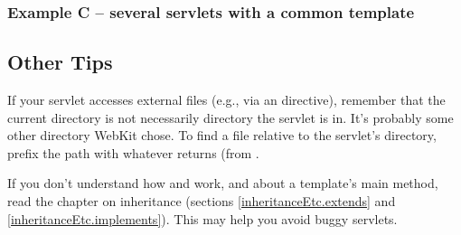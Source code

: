 \subsubsection*{Example C -- several servlets with a common template}




\subsection{Other Tips}
\label{webware.otherTips}

If your servlet accesses external files (e.g., via an 
directive), remember that the current directory is not necessarily directory
the servlet is in.  It's probably some other directory WebKit chose.  To find a
file relative to the servlet's directory, prefix the path with whatever
 returns (from .

If you don't understand how  and  work, and
about a template's main method, read the chapter on inheritance (sections
\ref{inheritanceEtc.extends} and \ref{inheritanceEtc.implements}).  This may
help you avoid buggy servlets.

